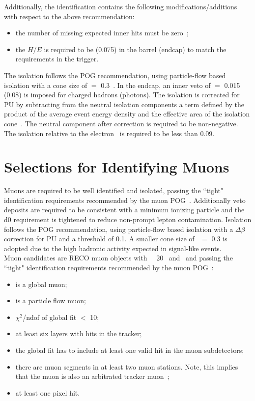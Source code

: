 Additionally, the identification contains the following modifications/additions with respect to the above recommendation:

\begin{itemize}
\item the number of missing expected inner hits must be zero~\cite{conv};

\item the $H/E$ is required to be  (0.075) in the barrel (endcap) to match the requirements in the trigger.
\end{itemize}

The isolation follows the POG recommendation, using particle-flow based isolation with a cone size of \DR  $=$ 0.3~\cite{egammapfisotwiki}.  
In the endcap, an inner veto of \DR $=$ 0.015 (0.08) is imposed for charged hadrons (photons). 
The isolation is corrected for PU by subtracting from the neutral isolation components a term defined by the product of the average event energy density and the effective area of the isolation cone~\cite{egammaisorhoaeff}.  The neutral component after correction is required to be non-negative.  
The isolation relative to the electron \pt\ is required to be less than 0.09.



\section{Selections for Identifying Muons}
\label{sec:MuonSelections}
Muons are required to be well identified and isolated, passing the ``tight" identification requirements recommended by the muon POG~\cite{muICHEP2012twiki}. Additionally veto deposits are required to be consistent with a minimum ionizing particle and the d0 requirement is tightened to reduce non-prompt lepton contamination.  
Isolation follows the POG recommendation, using  particle-flow based isolation with a $\Delta\beta$ correction for PU and a threshold of 0.1.
A smaller cone size of \DR\ $=$ 0.3 is adopted due to the high hadronic activity expected in signal-like events.\\

Muon candidates are RECO muon objects with \pt\ \gt\ 20 \GeV\ and \absetamu\ and passing the ``tight" identification requirements recommended by the muon POG~\cite{muICHEP2012twiki}:
\begin{itemize}
\item is a global muon;
\item is a particle flow muon;
\item $\chi^2$/ndof of global fit $<$ 10;
\item at least six layers with hits in the tracker;
\item the global fit has to include at least one valid hit in the muon subdetectors;
\item there are muon segments in at least two muon stations. Note, this implies that the muon is also an arbitrated tracker muon~\cite{swguidetrackermuonstwiki};
\item at least one pixel hit.
\end{itemize}

